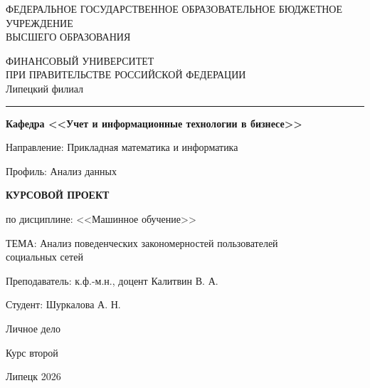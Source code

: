 \documentclass[14pt, a4paper]{extarticle}
\begin{document}
\thispagestyle{empty}
{\scriptsize
\begin{center}
ФЕДЕРАЛЬНОЕ ГОСУДАРСТВЕННОЕ ОБРАЗОВАТЕЛЬНОЕ БЮДЖЕТНОЕ УЧРЕЖДЕНИЕ\\ 
ВЫСШЕГО ОБРАЗОВАНИЯ    
\end{center}
}
{\bf
\begin{center}
ФИНАНСОВЫЙ УНИВЕРСИТЕТ\\ 
ПРИ ПРАВИТЕЛЬСТВЕ РОССИЙСКОЙ ФЕДЕРАЦИИ\\
Липецкий филиал
\end{center}
}
\hrule
\bigskip

{\small 
\begin{center}
\textbf{
Кафедра <<Учет и информационные технологии в бизнесе>>}
\end{center}
}
\bigskip

Направление: Прикладная математика и информатика                                                                                                                                                                                                                                                                                                     

\medskip
Профиль: Анализ данных

\vskip 2cm

\begin{center}
\textbf{КУРСОВОЙ ПРОЕКТ}
\end{center}

по дисциплине: <<Машинное обучение>>

\bigskip
\begin{center}
ТЕМА: Анализ поведенческих закономерностей пользователей\\ социальных сетей
\end{center}

\vskip 3.0cm

\textwidth Преподаватель: к.ф.-м.н., доцент Калитвин В. А.

\textwidth Студент: Шуркалова А. Н.

\textwidth Личное дело 

\textwidth Курс второй

\vskip 7.5cm

\begin{center}
Липецк 2026
\end{center}

\tableofcontents
\newpage

\end{document}
